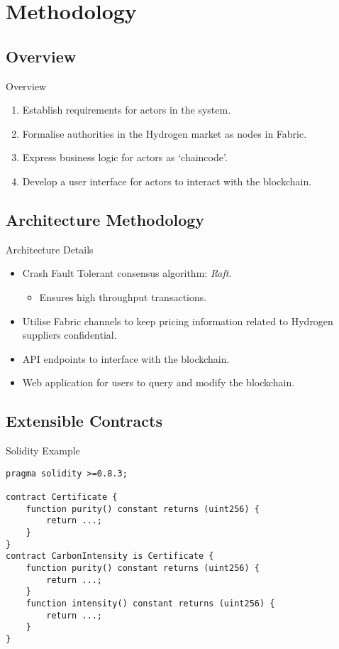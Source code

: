 \section{Methodology}
\subsection{Overview}
\begin{frame}{Overview}
    \begin{enumerate}
        \item Establish requirements for actors in the system.
        \item Formalise authorities in the Hydrogen market as nodes in Fabric.
        \item Express business logic for actors as `chaincode'.
        \item Develop a user interface for actors to interact with the
              blockchain.
    \end{enumerate}
\end{frame}
\subsection{Architecture Methodology}
\begin{frame}{Architecture Details}
    \begin{itemize}
        \item Crash Fault Tolerant consensus algorithm: \textit{Raft}.
              \begin{itemize}
                  \item Ensures high throughput transactions.
              \end{itemize}
        \item Utilise Fabric channels to keep pricing information related
              to Hydrogen suppliers confidential.
        \item API endpoints to interface with the blockchain.
        \item Web application for users to query and modify the blockchain.
    \end{itemize}
\end{frame}
\subsection{Extensible Contracts}
\begin{frame}[fragile]{Solidity Example}
    \begin{lstlisting}[language=Solidity]
pragma solidity >=0.8.3;

contract Certificate {
	function purity() constant returns (uint256) {
	    return ...;
	}
}
contract CarbonIntensity is Certificate {
	function purity() constant returns (uint256) {
	    return ...;
	}
    function intensity() constant returns (uint256) {
        return ...;
    }
}
\end{lstlisting}
\end{frame}